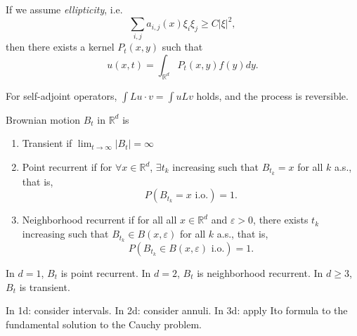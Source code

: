 If we assume \textit{ellipticity}, i.e. 
\[
	\sum_{i, j} a_{i, j}(x) \xi_i \xi_j \ge C |\xi|^2
,\] 
then there exists a kernel $P_t(x, y)$ such that
\[
	u(x, t) = \int _{\mathbb{R}^d} P_t(x, y) f(y) dy
.\] 

For self-adjoint operators, $\int L u \cdot  v = \int  u Lv$ holds, and the process is reversible.

\begin{definition}
	Brownian motion $B_t$ in $\mathbb{R}^d$ is
	\begin{enumerate}
		\item Transient if $\lim_{t \to \infty} |B_t| = \infty $
		\item Point recurrent if for $\forall  x \in \mathbb{R}^d$, $\exists  t_k$ increasing such that $B_{t_k} = x$ for all $k$ a.s., that is, 
			\[
				P\left( B_{t_k} = x \text{ i.o.} \right) = 1
			.\] 
		\item Neighborhood recurrent if for all all $x \in \mathbb{R}^d$ and $\varepsilon>0$, there exists $t_k $ increasing such that $B_{t_k} \in B(x, \varepsilon)$ for all $k$ a.s., that is,
			\[
				P\left( B_{t_k} \in  B(x, \varepsilon) \text{ i.o.} \right) = 1
			.\] 
	\end{enumerate}
\end{definition}

\begin{theorem}
	In $d = 1$, $B_t$ is point recurrent. In  $d = 2$, $B_t$ is neighborhood recurrent. In  $d \ge 3$, $B_t$ is transient.
\end{theorem}
In 1d: consider intervals.
In 2d: consider annuli.
In 3d: apply Ito formula to the fundamental solution to the Cauchy problem. 
